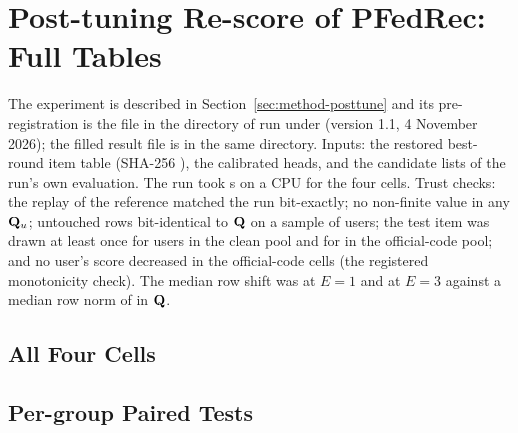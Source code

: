 \chapter{Post-tuning Re-score of PFedRec: Full Tables}
\label{app:posttune}

The experiment is described in Section~\ref{sec:method-posttune} and its pre-registration is the
file  in the directory of run \RunPfedrecShort{} under
 (version 1.1, 4 November 2026); the filled result file is
 in the same directory. Inputs: the restored
best-round item table (SHA-256 \PtGlobalsSha), the \DsUsers{} calibrated heads, and the
candidate lists of the run's own evaluation. The run took \PtElapsedSec{} s on a CPU for the
four cells. Trust checks: the replay of the reference matched the run bit-exactly; no
non-finite value in any $\mathbf{Q}_u$; untouched rows bit-identical to $\mathbf{Q}$ on a sample of users;
the test item was drawn at least once for \PtNHitClean{} users in the clean pool and for
\PtNHitLeaky{} in the official-code pool; and no user's score decreased in the official-code
cells (the registered monotonicity check). The median row shift was \PtRowShiftMedianEOne{} at
$E=1$ and \PtRowShiftMedianEThree{} at $E=3$ against a median row norm of \PtRowNormMedian{} in
$\mathbf{Q}$.

\section{All Four Cells}

\begin{table}[htbp]
  \caption{\ndcg{} / \hr{} / \mrr{} of the reference and the four cells, overall and by group.}
  \label{tab:posttune-cells}
  \centering\scriptsize
  \fittable{}
\end{table}

\section{Per-group Paired Tests}

\begin{table}[htbp]
  \caption{Paired tests against the shared-table reference by user group. Where $n_-=0$ the
  one-sided $p$ follows from the construction; for groups with few changed users the computed
  value is printed.}
  \label{tab:posttune-groups}
  \centering\scriptsize
  \fittable{}
\end{table}

